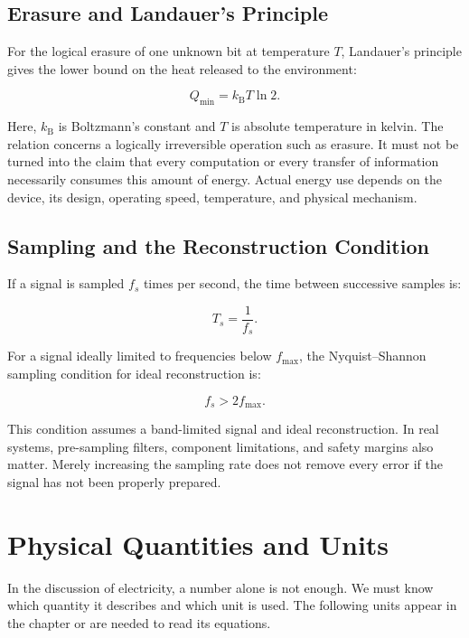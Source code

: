 \section{Erasure and Landauer's Principle}

For the logical erasure of one unknown bit at temperature \(T\), Landauer's principle gives the lower bound on the heat released to the environment:

\[
Q_{\min}=k_{\mathrm B}T\ln 2.
\]

Here, \(k_{\mathrm B}\) is Boltzmann's constant and \(T\) is absolute temperature in kelvin. The relation concerns a logically irreversible operation such as erasure. It must not be turned into the claim that every computation or every transfer of information necessarily consumes this amount of energy. Actual energy use depends on the device, its design, operating speed, temperature, and physical mechanism.

\section{Sampling and the Reconstruction Condition}

If a signal is sampled \(f_s\) times per second, the time between successive samples is:

\[
T_s=\frac{1}{f_s}.
\]

For a signal ideally limited to frequencies below \(f_{\max}\), the Nyquist–Shannon sampling condition for ideal reconstruction is:

\[
f_s>2f_{\max}.
\]

This condition assumes a band-limited signal and ideal reconstruction. In real systems, pre-sampling filters, component limitations, and safety margins also matter. Merely increasing the sampling rate does not remove every error if the signal has not been properly prepared.

\chapter{Physical Quantities and Units}
\label{app:physical-quantities}

In the discussion of electricity, a number alone is not enough. We must know which quantity it describes and which unit is used. The following units appear in the chapter or are needed to read its equations.

